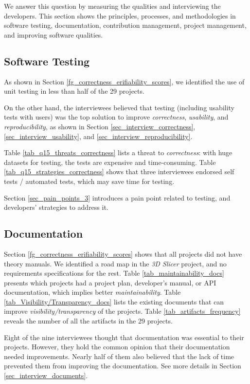 We answer this question by measuring the qualities and interviewing the developers. This section shows the principles, processes, and methodologies in software testing, documentation, contribution management, project management, and improving software qualities.

\subsection{Software Testing}
As shown in Section \ref{fg_correctness_erifiability_scores}, we identified the use of unit testing in less than half of the 29 projects.

On the other hand, the interviewees believed that testing (including usability tests with users) was the top solution to improve \textit{correctness}, \textit{usability}, and \textit{reproducibility}, as shown in Section \ref{sec_interview_correctness}, \ref{sec_interview_usability}, and \ref{sec_interview_reproducibility}.

Table \ref{tab_q15_threats_correctness} lists a threat to \textit{correctness}: with huge datasets for testing, the tests are expensive and time-consuming. Table \ref{tab_q15_strategies_correctness} shows that three interviewees endorsed self tests / automated tests, which may save time for testing.

Section \ref{sec_pain_points_3} introduces a pain point related to testing, and developers' strategies to address it.

\subsection{Documentation}
Section \ref{fg_correctness_erifiability_scores} shows that all projects did not have theory manuals. We identified a road map in the \textit{3D Slicer} project, and no requirements specifications for the rest. Table \ref{tab_maintainability_docs} presents which projects had a project plan, developer’s manual, or API documentation, which implies better \textit{maintainability}. Table \ref{tab_Visibility/Transparency_docs} lists the existing documents that can improve \textit{visibility/transparency} of the projects. Table \ref{tab_artifacts_frequency} reveals the number of all the artifacts in the 29 projects.

Eight of the nine interviewees thought that documentation was essential to their projects. However, they hold the common opinion that their documentation needed improvements. Nearly half of them also believed that the lack of time prevented them from improving the documentation. See more details in Section \ref{sec_interview_documents}.

